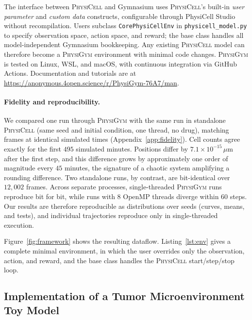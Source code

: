 \documentclass{article}
\newcommand{\physigym}{\textsc{PhysiGym}}
\newcommand{\physicell}{\textsc{PhysiCell}}
\begin{document}
The interface between \physicell{} and Gymnasium uses \physicell{}'s built-in
\emph{user parameter} and \emph{custom data} constructs, configurable through
PhysiCell Studio~\citep{heiland2024physicellstudio} without recompilation.
Users subclass \texttt{CorePhysiCellEnv} in \texttt{physicell\_model.py} to
specify observation space, action space, and reward; the base class handles
all model-independent Gymnasium bookkeeping.
Any existing \physicell{} model can therefore become a \physigym{} environment
with minimal code changes.
\physigym{} is tested on Linux, WSL, and macOS, with continuous integration via
GitHub Actions. Documentation and tutorials are at
\url{https://anonymous.4open.science/r/PhysiGym-76A7/man}.

\paragraph{Fidelity and reproducibility.}
We compared one run through \physigym{} with the same run in standalone
\physicell{} (same seed and initial condition, one thread, no drug), matching
frames at identical simulated times (Appendix~\ref{app:fidelity}). Cell counts
agree exactly for the first $495$ simulated minutes. Positions differ by
$7.1\times10^{-15}\,\mu$m after the first step, and this difference grows by
approximately one order of magnitude every $45$ minutes, the signature of a
chaotic system amplifying a rounding difference. Two standalone runs, by
contrast, are bit-identical over $12{,}002$ frames. Across separate processes,
single-threaded \physigym{} runs reproduce bit for bit, while runs with $8$
OpenMP threads diverge within $60$ steps. Our results are therefore
reproducible as distributions over seeds (curves, means, and tests), and
individual trajectories reproduce only in single-threaded execution.

Figure~\ref{fig:framework} shows the resulting dataflow.
Listing~\ref{lst:env} gives a complete minimal environment, in which the user
overrides only the observation, action, and reward, and the base class handles
the \physicell{} start/step/stop loop.




\subsection{Implementation of a Tumor Microenvironment Toy Model}
\label{sec:model}
\end{document}
